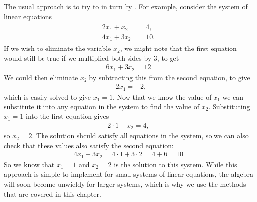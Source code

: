 \documentclass[letterpaper,10pt,english]{jupyterBook}
\begin{document}
\sphinxAtStartPar
The usual approach is to try to  in turn by . For example, consider the system of linear equations
\begin{equation*}
\begin{split} \begin{align*}
    2x_1 + x_2 &= 4, \\
    4x_1 + 3x_2 &= 10.
\end{align*} \end{split}
\end{equation*}
\sphinxAtStartPar
If we wish to eliminate the variable \(x_2\), we might note that the first equation would still be true if we multiplied both sides by \(3\), to get
\begin{equation*}
\begin{split} 6x_1 + 3x_2 = 12 \end{split}
\end{equation*}
\sphinxAtStartPar
We could then eliminate \(x_2\) by subtracting this from the second equation, to give
\begin{equation*}
\begin{split} -2 x_1 = -2,\end{split}
\end{equation*}
\sphinxAtStartPar
which is easily solved to give \(x_1 = 1\). Now that we know the value of \(x_1\) we can substitute it into any equation in the system to find the value of \(x_2\). Substituting \(x_1 = 1\) into the first equation gives
\begin{equation*}
\begin{split} 2 \cdot 1 + x_2 = 4, \end{split}
\end{equation*}
\sphinxAtStartPar
so \(x_2 = 2\). The solution should satisfy all equations in the system, so we can also check that these values also satisfy the second equation:
\begin{equation*}
\begin{split} 4x_1 + 3x_2  = 4 \cdot 1 + 3 \cdot 2 = 4 + 6 = 10 \end{split}
\end{equation*}
\sphinxAtStartPar
So we know that \(x_1 = 1\) and \(x_2 = 2\) is the solution to this system. While this approach is simple to implement for small systems of linear equations, the algebra will soon become unwieldy for larger systems, which is why we use the methods that are covered in this chapter.
\end{document}

